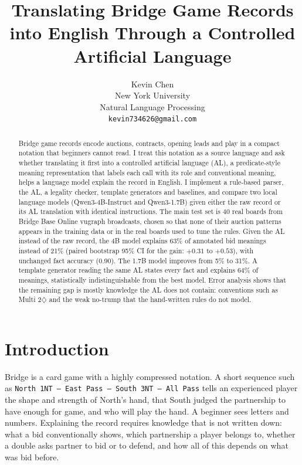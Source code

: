 \documentclass[11pt]{article}
\title{Translating Bridge Game Records into English Through a Controlled Artificial Language}
\author{
Kevin Chen \\
New York University \\
Natural Language Processing \\
\texttt{kevin734626@gmail.com}
}
\newcommand{\suitD}{$\diamondsuit$}
\begin{document}
\maketitle

\begin{abstract}
Bridge game records encode auctions, contracts, opening leads and play in a compact notation that beginners cannot read. I treat this notation as a source language and ask whether translating it first into a controlled artificial language (AL), a predicate-style meaning representation that labels each call with its role and conventional meaning, helps a language model explain the record in English. I implement a rule-based parser, the AL, a legality checker, template generators and baselines, and compare two local language models (Qwen3-4B-Instruct and Qwen3-1.7B) given either the raw record or its AL translation with identical instructions. The main test set is 40 real boards from Bridge Base Online vugraph broadcasts, chosen so that none of their auction patterns appears in the training data or in the real boards used to tune the rules. Given the AL instead of the raw record, the 4B model explains 63\% of annotated bid meanings instead of 21\% (paired bootstrap 95\% CI for the gain: $+0.31$ to $+0.53$), with unchanged fact accuracy (0.90). The 1.7B model improves from 5\% to 31\%. A template generator reading the same AL states every fact and explains 64\% of meanings, statistically indistinguishable from the best model. Error analysis shows that the remaining gap is mostly knowledge the AL does not contain: conventions such as Multi 2\suitD{} and the weak no-trump that the hand-written rules do not model.
\end{abstract}

\section{Introduction}

Bridge is a card game with a highly compressed notation. A short sequence such as \texttt{North 1NT -- East Pass -- South 3NT -- All Pass} tells an experienced player the shape and strength of North's hand, that South judged the partnership to have enough for game, and who will play the hand. A beginner sees letters and numbers. Explaining the record requires knowledge that is not written down: what a bid conventionally shows, which partnership a player belongs to, whether a double asks partner to bid or to defend, and how all of this depends on what was bid before.
\end{document}
